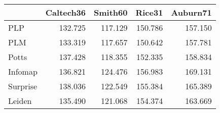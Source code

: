 \begin{tabular}{lrrrr}
\toprule
{} & Caltech36 & Smith60 &  Rice31 & Auburn71 \\
\midrule
PLP      &   132.725 & 117.129 & 150.786 &  157.150 \\
PLM      &   133.319 & 117.657 & 150.642 &  157.781 \\
Potts    &   137.428 & 118.355 & 152.335 &  158.834 \\
Infomap  &   136.821 & 124.476 & 156.983 &  169.131 \\
Surprise &   138.036 & 122.549 & 155.384 &  165.389 \\
Leiden   &   135.490 & 121.068 & 154.374 &  163.669 \\
\bottomrule
\end{tabular}
